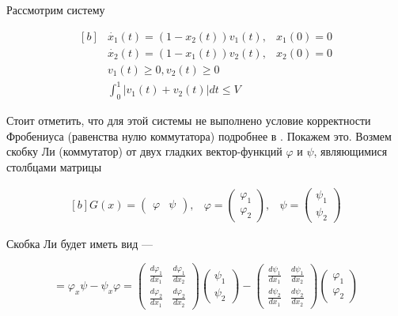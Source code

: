 Рассмотрим систему 

\begin{equation*}
  \begin{aligned}[b]
    &\dot{x_1}(t) = (1 -x_2(t))v_1(t), & x_1(0)=0\\
    &\dot{x_2}(t) = (1-x_1(t))v_2(t), & x_2(0) = 0\\[8pt]
    &v_1(t) \ge 0, v_2(t) \ge 0 \\
    &\int_{0}^{1} |v_1(t) + v_2(t)| dt \le V
  \end{aligned}
\end{equation*}


Стоит отметить, что для этой системы не выполнено условие корректности
Фробениуса (равенства нулю коммутатора) подробнее в
\cite{DS2000}. Покажем это. Возмем скобку Ли (коммутатор) от двух
гладких вектор-функций $\varphi$ и $\psi$, являющимися столбцами матрицы

\begin{equation*}
  \begin{aligned}[b]
    G(x) = 
    \begin{pmatrix}
      \varphi & \psi
    \end{pmatrix},
    &
    \varphi =
    \begin{pmatrix}
      \varphi_1\\ \varphi_2
    \end{pmatrix},
    &
    \psi =
    \begin{pmatrix}
      \psi_1 \\ \psi_2
    \end{pmatrix}
  \end{aligned}
\end{equation*}


Скобка Ли будет иметь вид ---

\begin{equation*}
  [\varphi,\psi] = \varphi_x \psi - \psi_x \varphi = 
  \begin{pmatrix}
    \frac{d \varphi_1}{d x_1} & \frac{d \varphi_1}{d x_2} \\
    \frac{d \varphi_2}{d x_1} & \frac{d \varphi_2}{d x_2}
  \end{pmatrix}
  \begin{pmatrix}
    \psi_1 \\ \psi_2
  \end{pmatrix}
  -
  \begin{pmatrix}
    \frac{d \psi_1}{d x_1} & \frac{d \psi_1}{d x_2} \\
    \frac{d \psi_2}{d x_1} & \frac{d \psi_2}{d x_2}
  \end{pmatrix}
  \begin{pmatrix}
    \varphi_1 \\ \varphi_2
  \end{pmatrix}
\end{equation*}


